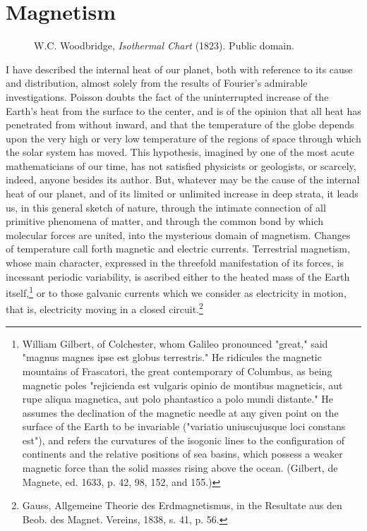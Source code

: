 
\chapter{Magnetism}

\begin{figure}[ht]
  \vspace{-40pt}
  \begin{centering}
      \caption{\footnotesize W.C. Woodbridge, \emph{Isothermal Chart} (1823). Public domain.}
  \end{centering}
\end{figure}
\clearpage

\lettrine[lines=4]{\goudy   I}{} have described the internal heat of our planet, both with reference to its cause and distribution, almost solely from the results of Fourier's admirable investigations. Poisson doubts the fact of the uninterrupted increase of the Earth's heat from the surface to the center, and is of the opinion that all heat has penetrated from without inward, and that the temperature of the globe depends upon the very high or very low temperature of the regions of space through which the solar system has moved. This hypothesis, imagined by one of the most acute mathematicians of our time, has not satisfied physicists or geologists, or scarcely, indeed, anyone besides its author. But, whatever may be the cause of the internal heat of our planet, and of its limited or unlimited increase in deep strata, it leads us, in this general sketch of nature, through the intimate connection of all primitive phenomena of matter, and through the common bond by which molecular forces are united, into the mysterious domain of magnetism. Changes of temperature call forth magnetic and electric currents. Terrestrial magnetism, whose main character, expressed in the threefold manifestation of its forces, is incessant periodic variability, is ascribed either to the heated mass of the Earth itself,\footnote{William Gilbert, of Colchester, whom Galileo pronounced "great," said "magnus magnes ipse est globus terrestris." He ridicules the magnetic mountains of Frascatori, the great contemporary of Columbus, as being magnetic poles "rejicienda est vulgaris opinio de montibus magneticis, aut rupe aliqua magnetica, aut polo phantastico a polo mundi distante." He assumes the declination of the magnetic needle at any given point on the surface of the Earth to be invariable ("variatio uniuscujusque loci constans est"), and refers the curvatures of the isogonic lines to the configuration of continents and the relative positions of sea basins, which possess a weaker magnetic force than the solid masses rising above the ocean. (Gilbert, de Magnete, ed. 1633, p. 42, 98, 152, and 155.)} or to those galvanic currents which we consider as electricity in motion, that is, electricity moving in a closed circuit.\footnote{Gauss, Allgemeine Theorie des Erdmagnetismus, in the Resultate aus den Beob. des Magnet. Vereins, 1838, s. 41, p. 56.}


